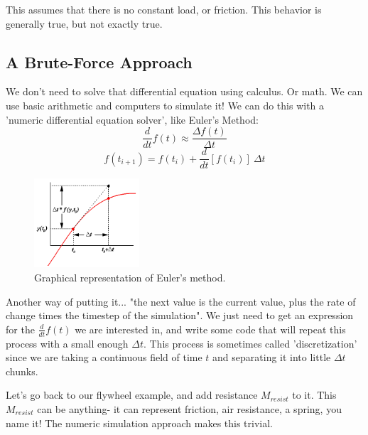 	This assumes that there is no constant load, or friction.
	This behavior is generally true, but not exactly true.
	
	\subsection{A Brute-Force Approach}
	We don't need to solve that differential equation using calculus. Or math. We can use basic arithmetic and computers to simulate it! We can do this with a 'numeric differential equation solver', like Euler's Method:
	\begin{equation}
		\frac{d}{dt} f(t) \approx \frac{\Delta f(t)}{\Delta t}
	\end{equation}\begin{equation}
		f(t_{i+1}) = f(t_{i}) + \frac{d}{dt}[f(t_{i})]\ {\Delta t}
	\end{equation}
	
	\begin{figure}[H]
		\includegraphics[width=0.35\textwidth]{imgs/euler_method.png}
		\caption{Graphical representation of Euler's method.}
	\end{figure}
	
	Another way of putting it... "the next value is the current value, plus the rate of change times the timestep of the simulation". 	We just need to get an expression for the $\frac{d}{dt}f(t)$ we are interested in, and write some code that will repeat this process with a small enough $\Delta t$. This process is sometimes called 'discretization' since we are taking a continuous field of time $t$ and separating it into little $\Delta t$ chunks.	
		
	Let's go back to our flywheel example, and add resistance $M_{resist}$ to it. This $M_{resist}$ can be anything- it can represent friction, air resistance, a spring, you name it! The numeric simulation approach makes this trivial.
	
